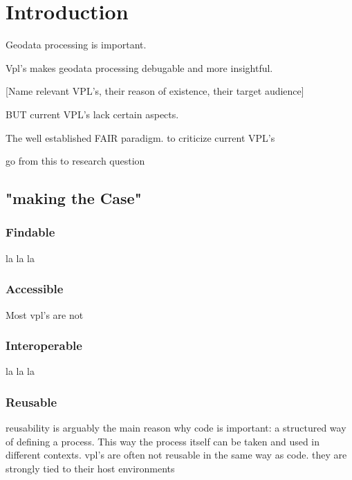 
\section{Introduction}

\par
Geodata processing is important.

\par
Vpl's makes geodata processing debugable and more insightful. 

[Name relevant VPL's, their reason of existence, their target audience] 


\par
BUT current VPL's lack certain aspects. 

The well established FAIR paradigm. to criticize current VPL's 

\par
go from this to research question



\subsection{"making the Case"}

\subsubsection{Findable}
la la la 

\subsubsection{Accessible}
Most vpl's are not 


\subsubsection{Interoperable}
la la la 

\subsubsection{Reusable}
reusability is arguably the main reason why code is important: a structured way of defining a process. 
This way the process itself can be taken and used in different contexts.
vpl's are often not reusable in the same way as code. they are strongly tied to their host environments

